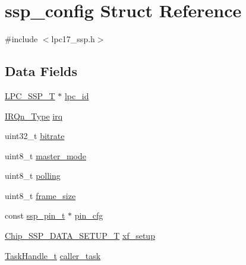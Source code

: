\hypertarget{structssp__config}{\section{ssp\-\_\-config Struct Reference}
\label{structssp__config}
}


{\ttfamily \#include $<$lpc17\-\_\-ssp.\-h$>$}

\subsection*{Data Fields}
\begin{DoxyCompactItemize}
\item 
\hyperlink{structLPC__SSP__T}{L\-P\-C\-\_\-\-S\-S\-P\-\_\-\-T} $\ast$ \hyperlink{structssp__config_aa41fc0d35203fc642251856d992921a7}{lpc\-\_\-id}
\item 
\hyperlink{group__CMSIS__175X__6X__IRQ_gaaaeafe7bd8401a46d55e8431b6326116}{I\-R\-Qn\-\_\-\-Type} \hyperlink{structssp__config_ab42626b056b0e7c9480fe22c2307e14b}{irq}
\item 
uint32\-\_\-t \hyperlink{structssp__config_a36d823a6f9091ec3b020fce6eb81e2ed}{bitrate}
\item 
uint8\-\_\-t \hyperlink{structssp__config_a16c90aad6065d69e14a5c9174a854d88}{master\-\_\-mode}
\item 
uint8\-\_\-t \hyperlink{structssp__config_a1e8c08df640404fc33f71c4d285e9e45}{polling}
\item 
uint8\-\_\-t \hyperlink{structssp__config_a3bd2315056bb323f3f64ab81d7c68dc6}{frame\-\_\-size}
\item 
const \hyperlink{lpc17__ssp_8h_a97fa3b0ab90125b28dca975a5c8ba257}{ssp\-\_\-pin\-\_\-t} $\ast$ \hyperlink{structssp__config_aa07c7d7a03b214bbc6c083243d2c055e}{pin\-\_\-cfg}
\item 
\hyperlink{structChip__SSP__DATA__SETUP__T}{Chip\-\_\-\-S\-S\-P\-\_\-\-D\-A\-T\-A\-\_\-\-S\-E\-T\-U\-P\-\_\-\-T} \hyperlink{structssp__config_ab4497ade90accc6a7ceed4bd2bbaf3cc}{xf\-\_\-setup}
\item 
\hyperlink{task_8h_ae95f44d4cfeb4a599c6cc258d241cb6b}{Task\-Handle\-\_\-t} \hyperlink{structssp__config_a4548055f54205d72c31b133a0b487806}{caller\-\_\-task}
\end{DoxyCompactItemize}



